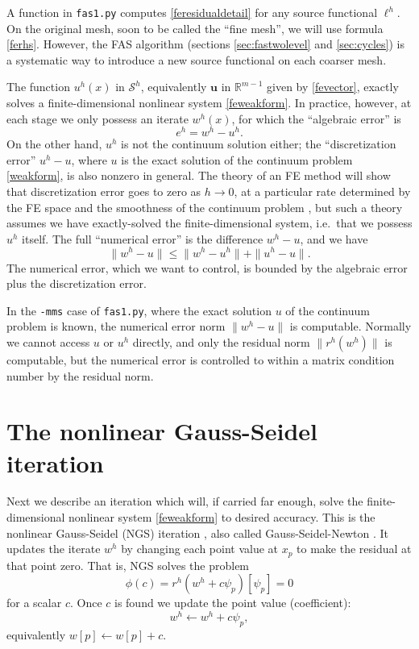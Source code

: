 \documentclass[letterpaper,final,12pt,reqno]{amsart}
\newcommand{\RR}{\mathbb{R}}
\newcommand{\bu}{\mathbf{u}}
\begin{document}
A function in \texttt{fas1.py} computes \eqref{feresidualdetail} for any source functional $\ell^h$.  On the original mesh, soon to be called the ``fine mesh'', we will use formula \eqref{ferhs}.  However, the FAS algorithm (sections \ref{sec:fastwolevel} and \ref{sec:cycles}) is a systematic way to introduce a new source functional on each coarser mesh.

The function $u^h(x)$ in $\mathcal{S}^h$, equivalently $\bu$ in $\RR^{m-1}$ given by \eqref{fevector}, exactly solves a finite-dimensional nonlinear system \eqref{feweakform}.  In practice, however, at each stage we only possess an iterate $w^h(x)$, for which the ``algebraic error'' is
\begin{equation}
  e^h = w^h - u^h.  \label{feerror}
\end{equation}
On the other hand, $u^h$ is not the continuum solution either; the ``discretization error'' $u^h-u$, where $u$ is the exact solution of the continuum problem \eqref{weakform}, is also nonzero in general.  The theory of an FE method will show that discretization error goes to zero as $h\to 0$, at a particular rate determined by the FE space and the smoothness of the continuum problem \cite{Elmanetal2014}, but such a theory assumes we have exactly-solved the finite-dimensional system, i.e.~that we possess $u^h$ itself.  The full ``numerical error'' is the difference $w^h-u$, and we have
\begin{equation}
\|w^h-u\| \le \|w^h-u^h\|+\|u^h-u\|.
\end{equation}
The numerical error, which we want to control, is bounded by the algebraic error plus the discretization error.

In the \texttt{-mms} case of \texttt{fas1.py}, where the exact solution $u$ of the continuum problem is known, the numerical error norm $\|w^h-u\|$ is computable.  Normally we cannot access $u$ or $u^h$ directly, and only the residual norm $\|r^h(w^h)\|$ is computable, but the numerical error is controlled to within a matrix condition number by the residual norm.


\section{The nonlinear Gauss-Seidel iteration}  \label{sec:ngs}

Next we describe an iteration which will, if carried far enough, solve the finite-dimensional nonlinear system \eqref{feweakform} to desired accuracy.  This is the nonlinear Gauss-Seidel (NGS) iteration \cite{Briggsetal2000}, also called Gauss-Seidel-Newton \cite{BrandtLivne2011}.  It updates the iterate $w^h$ by changing each point value at $x_p$ to make the residual at that point zero.  That is, NGS solves the problem
\begin{equation}
\phi(c) = r^h(w^h + c \psi_p)[\psi_p] = 0  \label{ngspointproblem}
\end{equation}
for a scalar $c$.  Once $c$ is found we update the point value (coefficient):
\begin{equation}
  w^h \leftarrow w^h + c \psi_p,  \label{ngspointupdate}
\end{equation}
equivalently $w[p] \leftarrow w[p] + c$.
\end{document}
